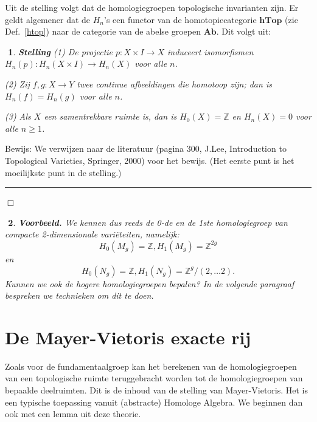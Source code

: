 \documentclass[12pt]{book}
\newcommand{\bew}{{\sc Bewijs: }}
\newcommand{\B}{\rule{1mm}{0mm} \hfill $\Box$ }
\newtheorem{stelh}{$\!\!$}[section]
\newenvironment{stel}{\begin{stelh}{\em {\bf Stelling }}}{\end{stelh}}
\newtheorem{vbh}[stelh]{$\!\!$}
\newenvironment{vb}{\begin{vbh} \em {\bf Voorbeeld.} }{\end{vbh}}
\begin{document}
Uit de stelling volgt dat de homologiegroepen topologische invarianten zijn. Er geldt algemener dat de $H_n$'s een functor van  de homotopiecategorie $\mathbf{hTop}$ (zie Def.~\ref{htop}) naar de categorie van de abelse groepen $\mathbf{Ab}$. Dit volgt uit:

\begin{stel}
{\rm (1)} De projectie $p:X\times I\to X$ induceert isomorfismen $H_{n}(p):H_{n}(X\times I)\to H_{n}(X)$
voor alle $n$.

{\rm (2)} Zij $f,g:X\to Y$ twee continue afbeeldingen die homotoop zijn; dan is $H_{n}(f)=H_{n}(g)$ voor
alle $n$.

{\rm (3)} Als $X$ een samentrekbare ruimte is, dan is $H_{0}(X)=\mathbb{Z}$ en $H_{n}(X)=0$ voor alle
$n\geq 1$. \label{homotopieinv}
\end{stel}

\bew We verwijzen naar de literatuur (pagina 300, J.Lee, Introduction to Topological Varieties, Springer, 2000) voor het bewijs. (Het eerste punt is het moei\-lijkste punt in de
stelling.) \B


\begin{vb} We kennen dus reeds de 0-de en
de 1ste homologiegroep van compacte 2-dimensionale vari\"eteiten, namelijk:
$$H_{0}(M_g)=\mathbb{Z}, H_{1}(M_g)=\mathbb{Z}^{2g}$$
en
$$H_{0}(N_g)=\mathbb{Z}, H_{1}(N_g)=\mathbb{Z}^{g}/(2, \ldots 2).$$
Kunnen we ook de hogere homologiegroepen bepalen? In de volgende paragraaf bespreken we technieken om dit te doen.
\end{vb}

\section{De Mayer-Vietoris exacte rij}

Zoals voor de fundamentaalgroep kan het berekenen van de homologiegroepen van een topologische ruimte
teruggebracht worden tot de homologiegroepen van bepaalde deelruimten. Dit is de inhoud van de stelling van
Mayer-Vietoris. Het is een typische toepassing vanuit  (abstracte) Homologe Algebra. We beginnen dan ook met
een lemma uit deze theorie.
\end{document}
